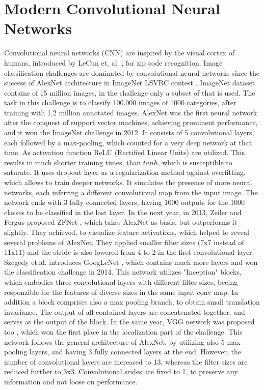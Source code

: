 \section{Modern Convolutional Neural Networks}\label{s:convnets}
Convolutional neural networks (CNN) are inspired by the visual cortex of humans,  introduced by LeCun et. al. \cite{LeCun:1989:BAH:1351079.1351090}, for zip code recognition. Image classification challenges are dominated by convolutional neural networks since the success of AlexNet architecture \cite{NIPS2012_4824} in ImageNet LSVRC contest \cite{ILSVRC15}. ImageNet dataset contains of 15 million images, in the challenge only a subset of that is used. The task in this challenge is to classify 100.000 images of 1000 categories, after training with 1.2 million annotated images.
\bigbreak
AlexNet was the first neural network after the conquest of support vector machines, achieving prominent performance, and it won the ImageNet challenge in 2012. It consists of 5 convolutional layers, each followed by a max-pooling, which counted for a very deep network at that time. As activation function ReLU (Rectified Linear Units) are utilized. This results in much shorter training times, than $tanh$, which is susceptible to saturate. It uses dropout layer \cite{journals/corr/abs-1207-0580} as a regularization method against overfitting, which allows to train deeper networks. It simulates the presence of more neural networks, each inferring a different convolutional map from the input image. The network ends with 3 fully connected layers, having 1000 outputs for the 1000 classes to be classified in the last layer.
\bigbreak
In the next year, in 2013, Zeiler and Fergus proposed ZFNet \cite{DBLP:journals/corr/ZeilerF13}, which takes AlexNet as basis, but outperforms it slightly. They achieved, to visualize feature activations, which helped to reveal several problems of AlexNet. They applied smaller filter sizes (7x7 instead of 11x11) and the stride is also lowered from 4 to 2 in the first convolutional layer. 
\bigbreak
Szegedy et.al. introduces GoogLeNet \cite{DBLP:journals/corr/SzegedyLJSRAEVR14}, which contains much more layers and won the classification challenge in 2014. This network utilizes "Inception" blocks, which embodies three convolutional layers with different filter sizes, beeing responzible for the features of diverse sizes in the same input conv map. In addition a block comprises also a max pooling branch, to obtain small translation invariance. The output of all contained layers are concatenated together, and serves as the output of the block. In the same year, VGG network was proposed too \cite{Simonyan14c}, which won the first place in the localization part of the challenge. This network follows the general architecture of AlexNet, by utilizing also 5 max-pooling layers, and having 3 fully connected layers at the end. However, the number of convolutional layers are increased to 13, whereas the filter sizes are reduced further to 3x3. Convolutional srides are fixed to 1, to preserve any information and not loose on performance.
